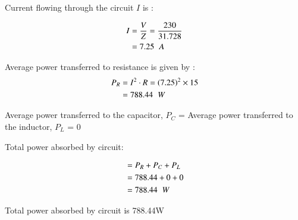 \documentclass[journal,12pt,twocolumn]{IEEEtran}
\providecommand{\brak}[1]{\ensuremath{\left(#1\right)}}
\theoremstyle{remark}
\begin{document}
Current flowing through the circuit $I$ is :

\begin{align}
	I&=\frac{V}{Z}=\frac{230}{31.728}
	\\&=7.25\hspace{0.2cm}A
\end{align}

Average power transferred to resistance is given by :
\begin{align}
	P_R &= I^2\cdot R = \brak{7.25}^2 \times 15
	\\&=788.44\hspace{0.2cm}W
\end{align}

Average power transferred to the capacitor, $P_C$ = Average power transferred to the inductor, $P_L$ = 0

Total power absorbed by circuit:

\begin{align}
	&= P_R + P_C + P_L
	\\&= 788.44 + 0 + 0
	\\&= 788.44\hspace{0.2cm}W
\end{align}

Total power absorbed by circuit is 788.44\hspace{0.01cm}W
 
\end{document}
